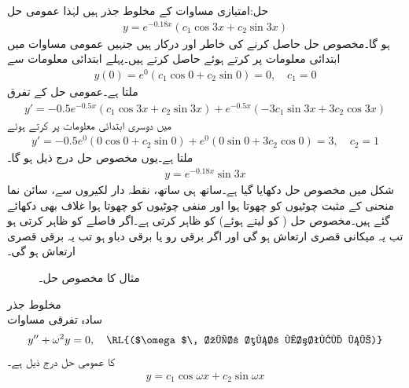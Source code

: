 حل:امتیازی مساوات  کے مخلوط جذر  ہیں لہٰذا عمومی حل
\begin{align*}
y=e^{-0.18x}(c_1 \cos 3x+c_2 \sin 3x)
\end{align*}
ہو گا۔مخصوص حل حاصل کرنے کی خاطر  اور  درکار ہیں جنہیں عمومی مساوات میں ابتدائی معلومات پر کرتے ہوئے حاصل کرتے ہیں۔پہلے ابتدائی معلومات سے
\begin{align*}
y(0)=e^{0}(c_1 \cos 0+c_2 \sin 0)=0, \quad c_1=0
\end{align*}
ملتا ہے۔عمومی حل کے تفرق
\begin{align*}
y'=-0.5e^{-0.5x}(c_1 \cos 3x+c_2 \sin 3x)+e^{-0.5x}(-3c_1 \sin 3x+3c_2 \cos 3x)
\end{align*}
میں دوسری ابتدائی معلومات پر کرتے ہوئے
\begin{align*}
y'=-0.5e^{0}(0 \cos 0+c_2 \sin 0)+e^{0}(0 \sin 0+3c_2 \cos 0)=3, \quad c_2=1
\end{align*}
ملتا ہے۔یوں مخصوص حل درج ذیل ہو گا۔
\begin{align*}
y=e^{-0.18x}\sin 3x
\end{align*}
شکل  میں مخصوص حل دکھایا گیا ہے۔ساتھ ہی ساتھ، نقطہ دار لکیروں سے، سائن نما منحنی کے مثبت چوٹیوں کو چھوتا ہوا   اور منفی چوٹیوں کو چھوتا ہوا غلاف  بھی دکھائے گئے ہیں۔مخصوص حل ( کو  لیتے ہوئے)  کو ظاہر کرتی ہے۔اگر  فاصلے کو ظاہر کرتی ہو تب یہ میکانی قصری ارتعاش ہو گی اور اگر  برقی رو یا برقی دباو ہو تب یہ برقی قصری ارتعاش ہو گی۔
\begin{figure}
\centering
{}
\caption{مثال  کا مخصوص حل۔}
\label{شکل_مثال_سادہ_دو_درجی_مخلوط_جذر_الف}
\end{figure}

\quad مخلوط جذر\\
سادہ تفرقی مساوات
\begin{align*}
y''+\omega^2 y=0,\quad \text{\RL{($\omega$\, غیر صفر مستقل ہے)}}
\end{align*}
کا عمومی حل درج ذیل ہے۔
\begin{align*}
y=c_1 \cos \omega x+c_2 \sin \omega x
\end{align*}

